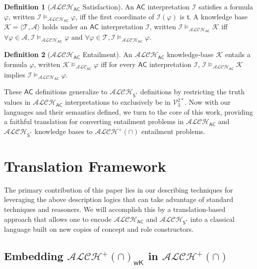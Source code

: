 \documentclass[letterpaper]{article} %
\theoremstyle{definition}
\theoremstyle{definition}
\newtheorem{definition}{Definition}
\theoremstyle{definition}
\theoremstyle{definition}
\theoremstyle{definition}
\newcommand{\vt}{\mathfrak{t}}
\begin{document}
\begin{definition}[$\mathcal{ALCH}_\mathsf{AC}$ Satisfaction]\label{def:AC-Sat}
    An $\mathsf{AC}$ interpretation $\mathcal{I}$ satisfies a formula $\varphi$, written $\mathcal{I}\models_{\mathcal{ALCH}_\mathsf{AC}}\varphi$, iff the first coordinate of $\mathcal{I}(\varphi)$ is $\vt$. A knowledge base $\mathcal{K} = \langle \mathcal{T},\mathcal{A}\rangle$ holds under an $\mathsf{AC}$ interpretation $\mathcal{I}$, written $\mathcal{I}\models_{\mathcal{ALCH}_\mathsf{AC}}\mathcal{K}$ iff $\forall \varphi \in \mathcal{A}, \mathcal{I}\models_{\mathcal{ALCH}_\mathsf{AC}}\varphi \text{ and } \forall \varphi \in \mathcal{T}, \mathcal{I}\models_{\mathcal{ALCH}_\mathsf{AC}}\varphi$. 
\end{definition}
\begin{definition}[$\mathcal{ALCH}_\mathsf{AC}$ Entailment]\label{def:AC-Ent}
An $\mathcal{ALCH}_\mathsf{AC}$ knowledge-base $\mathcal{K}$ entails a formula $\varphi$, written $\mathcal{K} \models_{\mathcal{ALC}_{\mathsf{AC}}} \varphi$ iff for every $\mathsf{AC}$ interpretation $\mathcal{I}$, $\mathcal{I}\models_{\mathcal{ALCH}_\mathsf{AC}}\mathcal{K}$ implies $\mathcal{I}\models_{\mathcal{ALCH}_\mathsf{AC}}\varphi$.
\end{definition}
These $\mathsf{AC}$ definitions generalize to $\mathcal{ALCH}_{\mathsf{S}^*}$ definitions by restricting the truth values in $\mathcal{ALCH}_\mathsf{AC}$ interpretations to exclusively be in $\mathcal{V}_3^{2*}$. Now with our languages and their semantics defined, we turn to the core of this work, providing a faithful translation for converting entailment problems in $\mathcal{ALCH}_\mathsf{AC}$ and $\mathcal{ALCH}_\mathsf{S^*}$ knowledge bases to $\mathcal{ALCH^+(\cap)}$ entailment problems.  

\section{Translation Framework}

The primary contribution of this paper lies in our describing techniques for leveraging the above description logics that can take advantage of standard techniques and reasoners. We will accomplish this by a translation-based approach that allows one to encode $\mathcal{ALCH}_{\mathsf{AC}}$ and $\mathcal{ALCH}_{\mathsf{S}^*}$ into a classical language built on new copies of concept and role constructors.

\subsection{Embedding $\mathcal{ALCH}^+(\cap)_{\mathsf{wK}}$ in $\mathcal{ALCH}^+(\cap)$}
\end{document}
